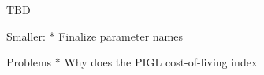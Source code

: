 
TBD 



Smaller: 
* Finalize parameter names 


Problems 
* Why does the PIGL cost-of-living index 